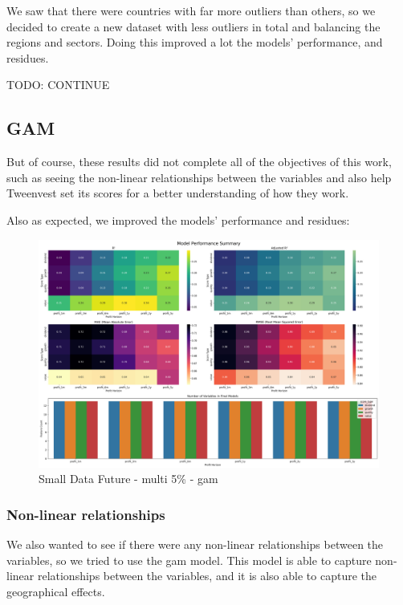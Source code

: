 \documentclass[11pt,english,a4paper,hidelinks]{book}
\begin{document}
\noindent We saw that there were countries with far more outliers than others, so we decided to create a new dataset with less outliers in total and balancing the regions and sectors. Doing this improved a lot the models' performance, and residues.

TODO: CONTINUE

\subsection{GAM}

\noindent But of course, these results did not complete all of the objectives of this work, such as seeing the non-linear relationships between the variables and also help Tweenvest set its scores for a better understanding of how they work.

\vspace{0.5cm}
\noindent Also as expected, we improved the models' performance and residues:

\begin{figure}[H]
    \centering
    \includegraphics[width=1\textwidth]{images/code/models/general_regression/Small Data future - IF_performance.png}
    \caption{Small Data Future - \acrshort{multi} 5\% - \acrshort{gam}}
    \label{fig:gam_linear_regression}
\end{figure}

\subsubsection{Non-linear relationships}

\noindent We also wanted to see if there were any non-linear relationships between the variables, so we tried to use the \acrshort{gam} model. This model is able to capture non-linear relationships between the variables, and it is also able to capture the geographical effects.
\end{document}
